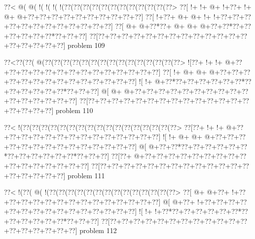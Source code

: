 \vbox{\vbox{\goo
\0??<\- @(\- @(\- !(\- !(\- !(\- !(\0??(\0??(\0??(\0??(\0??(\0??(\0??(\0??(\0??(\0??(\0??(\0??>
\0??[\- !+\- !+\- @+\- !+\0??+\- !+\- @+\- @+\0??+\0??+\0??+\0??+\0??+\0??+\0??+\0??+\0??+\0??]
\0??[\- !+\0??+\- @+\- @+\- !+\- !+\0??+\0??+\0??+\0??+\0??+\0??+\0??+\0??+\0??+\0??+\0??+\0??]
\0??[\- @+\- @+\0??*\0??+\- @+\- @+\- @+\0??+\0??*\0??+\0??+\0??+\0??+\0??+\0??*\0??+\0??+\0??]
\0??[\0??+\0??+\0??+\0??+\0??+\0??+\0??+\0??+\0??+\0??+\0??+\0??+\0??+\0??+\0??+\0??+\0??+\0??]
}
\hfil problem 109\hfil\break
}



\vbox{\vbox{\goo
\0??<\0??(\0??(\- @(\0??(\0??(\0??(\0??(\0??(\0??(\0??(\0??(\0??(\0??(\0??(\0??(\0??(\0??(\0??>
\- ![\0??+\- !+\- !+\- @+\0??+\0??+\0??+\0??+\0??+\0??+\0??+\0??+\0??+\0??+\0??+\0??+\0??+\0??]
\0??[\- !+\- @+\- @+\- @+\0??+\0??+\0??+\0??+\0??+\0??+\0??+\0??+\0??+\0??+\0??+\0??+\0??+\0??]
\- ![\- !+\- @+\0??*\0??+\0??+\0??+\0??+\0??+\0??*\0??+\0??+\0??+\0??+\0??+\0??*\0??+\0??+\0??]
\- @[\- @+\- @+\0??+\0??+\0??+\0??+\0??+\0??+\0??+\0??+\0??+\0??+\0??+\0??+\0??+\0??+\0??+\0??]
\0??[\0??+\0??+\0??+\0??+\0??+\0??+\0??+\0??+\0??+\0??+\0??+\0??+\0??+\0??+\0??+\0??+\0??+\0??]
}
\hfil problem 110\hfil\break
}



\vbox{\vbox{\goo
\0??<\- !(\0??(\0??(\0??(\0??(\0??(\0??(\0??(\0??(\0??(\0??(\0??(\0??(\0??(\0??(\0??(\0??(\0??>
\0??[\0??+\- !+\- !+\- @+\0??+\0??+\0??+\0??+\0??+\0??+\0??+\0??+\0??+\0??+\0??+\0??+\0??+\0??]
\- ![\- !+\- @+\- @+\- @+\0??+\0??+\0??+\0??+\0??+\0??+\0??+\0??+\0??+\0??+\0??+\0??+\0??+\0??]
\- @[\- @+\0??+\0??*\0??+\0??+\0??+\0??+\0??+\0??*\0??+\0??+\0??+\0??+\0??+\0??*\0??+\0??+\0??]
\0??[\0??+\- @+\0??+\0??+\0??+\0??+\0??+\0??+\0??+\0??+\0??+\0??+\0??+\0??+\0??+\0??+\0??+\0??]
\0??[\0??+\0??+\0??+\0??+\0??+\0??+\0??+\0??+\0??+\0??+\0??+\0??+\0??+\0??+\0??+\0??+\0??+\0??]
}
\hfil problem 111\hfil\break
}



\vbox{\vbox{\goo
\0??<\- !(\0??(\- @(\- !(\0??(\0??(\0??(\0??(\0??(\0??(\0??(\0??(\0??(\0??(\0??(\0??(\0??(\0??>
\0??[\- @+\- @+\0??+\- !+\0??+\0??+\0??+\0??+\0??+\0??+\0??+\0??+\0??+\0??+\0??+\0??+\0??+\0??]
\- @[\- @+\0??+\- !+\0??+\0??+\0??+\0??+\0??+\0??+\0??+\0??+\0??+\0??+\0??+\0??+\0??+\0??+\0??]
\- ![\- !+\- !+\0??*\0??+\0??+\0??+\0??+\0??+\0??*\0??+\0??+\0??+\0??+\0??+\0??*\0??+\0??+\0??]
\0??[\0??+\0??+\0??+\0??+\0??+\0??+\0??+\0??+\0??+\0??+\0??+\0??+\0??+\0??+\0??+\0??+\0??+\0??]
}
\hfil problem 112\hfil\break
}



